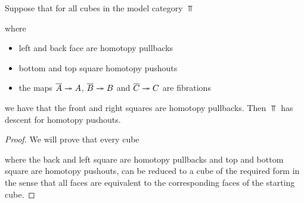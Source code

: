 \begin{lemma}\label{lem:reductionStepDescent}
    Suppose that for all cubes in the model category $\Top$
    \begin{center}
    \end{center}
    where
    \begin{itemize}
        \item left and back face are homotopy pullbacks
        \item bottom and top square homotopy pushouts 
        \item the maps $\overline{A}\xtwoheadrightarrow{} A$, $\overline{B}\xtwoheadrightarrow{} B$ and $\overline{C}\xtwoheadrightarrow{} C$ are fibrations
    \end{itemize}
    we have that the front and right squares are homotopy pullbacks.
    Then $\Top$ has descent for homotopy pushouts.
    \begin{proof}
        We will prove that every cube
        \begin{center}
        \end{center}
        where the back and left square are homotopy pullbacks and top and bottom square are homotopy pushouts, can be reduced to a cube of the required form in the sense that all faces are equivalent to the corresponding faces of the starting cube.


\end{proof}
\end{lemma}
